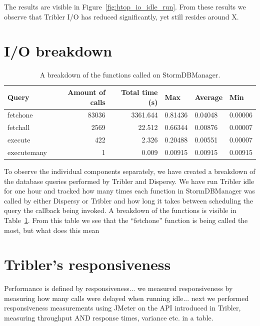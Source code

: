 The results are visible in Figure~\ref{fig:htop_io_idle_run}. 
From these results we observe that Tribler I/O has reduced significantly, yet still resides around X.

\section{I/O breakdown}

\begin{table}[]
	\centering
	\caption{A breakdown of the functions called on StormDBManager.}
	\label{table:breakdown_tribler_idle}
	\begin{tabular}{|l|r|r|l|l|l|}
		\hline
		\textbf{Query}	& \textbf{Amount of calls} & \textbf{Total time (s)} & \textbf{Max}  & \textbf{Average} & \textbf{Min} \\ \hline
		fetchone	& 83036	& 3361.644 	& 0.81436	& 0.04048	& 0.00006 \\ \hline
		fetchall	& 2569	& 22.512	& 0.66344	& 0.00876	& 0.00007 \\ \hline
		execute		& 422	& 2.326  	& 0.20488	& 0.00551	& 0.00007 \\ \hline
		executemany	& 1		& 0.009 	& 0.00915 	& 0.00915	& 0.00915 \\ \hline
	\end{tabular}
\end{table}

To observe the individual components separately, we have created a breakdown of the database queries performed by Tribler and Dispersy.
We have run Tribler idle for one hour and tracked how many times each function in StormDBManager was called by either Dispersy or Tribler and how long it takes between scheduling the query the callback being invoked.
A breakdown of the functions is visible in Table~\ref{table:breakdown_tribler_idle}.
From this table we see that the \enquote{fetchone} function is being called the most, but what does this mean

\section{Tribler's responsiveness}

Performance is defined by responsiveness... we measured responsiveness by measuring how many calls were delayed when running idle... next we performed responsiveness measurements using JMeter on the API introduced in Tribler, measuring throughput AND response times, variance etc. in a table. 

